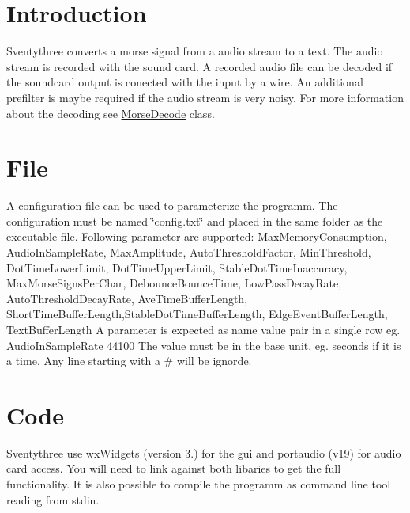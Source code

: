 \hypertarget{index_Introduction}{}\section{Introduction}\label{index_Introduction}
Sventythree converts a morse signal from a audio stream to a text. The audio stream is recorded with the sound card. A recorded audio file can be decoded if the soundcard output is conected with the input by a wire. An additional prefilter is maybe required if the audio stream is very noisy. For more information about the decoding see \hyperlink{classMorseDecode}{Morse\+Decode} class.\hypertarget{index_Configuration}{}\section{File}\label{index_Configuration}
A configuration file can be used to parameterize the programm. The configuration must be named \char`\"{}config.\+txt\char`\"{} and placed in the same folder as the executable file. Following parameter are supported\+: Max\+Memory\+Consumption, Audio\+In\+Sample\+Rate, Max\+Amplitude, Auto\+Threshold\+Factor, Min\+Threshold, Dot\+Time\+Lower\+Limit, Dot\+Time\+Upper\+Limit, Stable\+Dot\+Time\+Inaccuracy, Max\+Morse\+Signs\+Per\+Char, Debounce\+Bounce\+Time, Low\+Pass\+Decay\+Rate, Auto\+Threshold\+Decay\+Rate, Ave\+Time\+Buffer\+Length, Short\+Time\+Buffer\+Length,Stable\+Dot\+Time\+Buffer\+Length, Edge\+Event\+Buffer\+Length, Text\+Buffer\+Length A parameter is expected as name value pair in a single row eg. Audio\+In\+Sample\+Rate 44100 The value must be in the base unit, eg. seconds if it is a time. Any line starting with a \# will be ignorde.\hypertarget{index_Source}{}\section{Code}\label{index_Source}
Sventythree use wx\+Widgets (version 3.) for the gui and portaudio (v19) for audio card access. You will need to link against both libaries to get the full functionality. It is also possible to compile the programm as command line tool reading from stdin. 